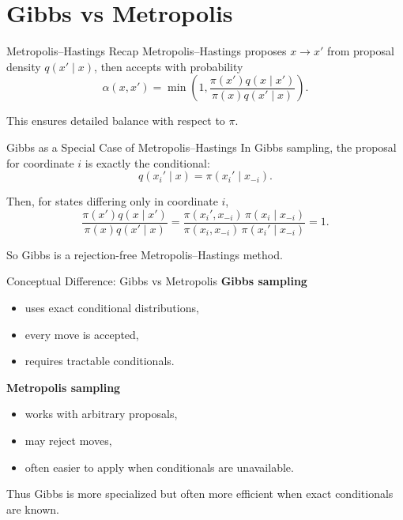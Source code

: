 \documentclass[aspectratio=169]{beamer}
\begin{document}
\section{Gibbs vs Metropolis}

\begin{frame}{Metropolis--Hastings Recap}
Metropolis--Hastings proposes \(x\to x'\) from proposal density \(q(x'\mid x)\), then accepts with probability
\[
\alpha(x,x')=
\min\left(
1,\frac{\pi(x')q(x\mid x')}{\pi(x)q(x'\mid x)}
\right).
\]

This ensures detailed balance with respect to \(\pi\).
\end{frame}

\begin{frame}{Gibbs as a Special Case of Metropolis--Hastings}
In Gibbs sampling, the proposal for coordinate \(i\) is exactly the conditional:
\[
q(x_i'\mid x)=\pi(x_i'\mid x_{-i}).
\]

Then, for states differing only in coordinate \(i\),
\[
\frac{\pi(x')q(x\mid x')}{\pi(x)q(x'\mid x)}
=
\frac{\pi(x_i',x_{-i})\,\pi(x_i\mid x_{-i})}{\pi(x_i,x_{-i})\,\pi(x_i'\mid x_{-i})}=1.
\]

So Gibbs is a rejection-free Metropolis--Hastings method.
\end{frame}

\begin{frame}{Conceptual Difference: Gibbs vs Metropolis}
\textbf{Gibbs sampling}
\begin{itemize}
    \item uses exact conditional distributions,
    \item every move is accepted,
    \item requires tractable conditionals.
\end{itemize}

\textbf{Metropolis sampling}
\begin{itemize}
    \item works with arbitrary proposals,
    \item may reject moves,
    \item often easier to apply when conditionals are unavailable.
\end{itemize}

Thus Gibbs is more specialized but often more efficient when exact conditionals are known.
\end{frame}
\end{document}
